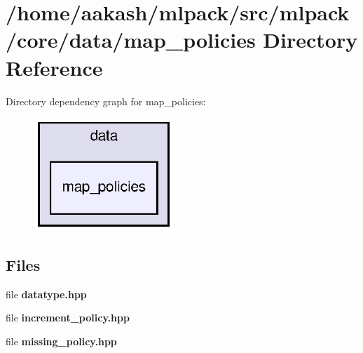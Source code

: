 \section{/home/aakash/mlpack/src/mlpack/core/data/map\+\_\+policies Directory Reference}
\label{dir_6b9fa97388050abaff55d13799cc7bdd}
Directory dependency graph for map\+\_\+policies\+:
\nopagebreak
\begin{figure}[H]
\begin{center}
\leavevmode
\includegraphics[width=150pt]{dir_6b9fa97388050abaff55d13799cc7bdd_dep}
\end{center}
\end{figure}
\subsection*{Files}
\begin{DoxyCompactItemize}
\item 
file \textbf{ datatype.\+hpp}
\item 
file \textbf{ increment\+\_\+policy.\+hpp}
\item 
file \textbf{ missing\+\_\+policy.\+hpp}
\end{DoxyCompactItemize}
